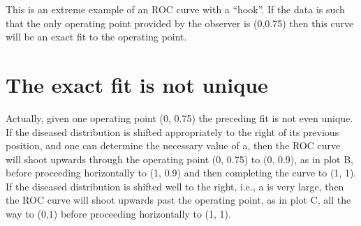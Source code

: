\documentclass[
]{book}
\begin{document}
This is an extreme example of an ROC curve with a ``hook''. If the data is such that the only operating point provided by the observer is (0,0.75) then this curve will be an exact fit to the operating point.

\hypertarget{the-exact-fit-is-not-unique}{%
\section{The exact fit is not unique}\label{the-exact-fit-is-not-unique}}

Actually, given one operating point (0, 0.75) the preceding fit is not even unique. If the diseased distribution is shifted appropriately to the right of its previous position, and one can determine the necessary value of a, then the ROC curve will shoot upwards through the operating point (0, 0.75) to (0, 0.9), as in plot B, before proceeding horizontally to (1, 0.9) and then completing the curve to (1, 1). If the diseased distribution is shifted well to the right, i.e., a is very large, then the ROC curve will shoot upwards past the operating point, as in plot C, all the way to (0,1) before proceeding horizontally to (1, 1).
\end{document}
